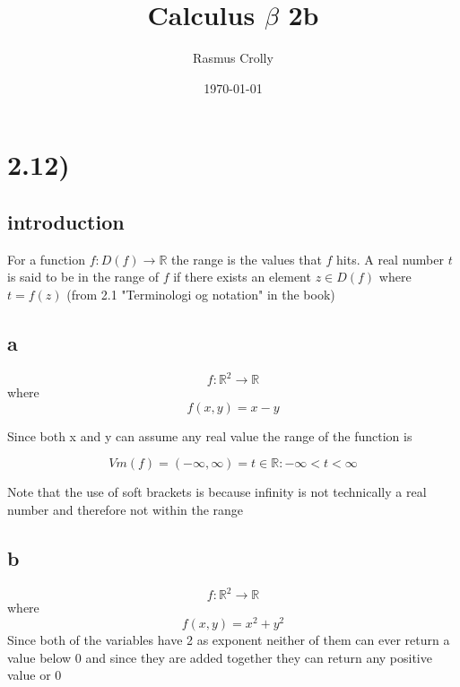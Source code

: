 \documentclass[12pt,a4paper]{article}
\title{Calculus $\beta$ 2b}
\author{Rasmus Crolly}
\date{\today}
\newcommand{\R}{\mathbb{R}}
\begin{document}
\maketitle

\section{2.12)}


\subsection{introduction}
For a function 
\begin{math}
f : D(f)\to\R
\end{math}
the range is the values that \begin{math}
f
\end{math}
hits.
A real number \begin{math}
t
\end{math}
is said to be in the range of 
\begin{math}
f
\end{math}
if there exists an element \begin{math}
z \in D(f)
\end{math}
where
\begin{math}
t=f(z)
\end{math}
(from 2.1 "Terminologi og notation" in the book) \cite{calcbeta2.1}


\subsection{a}
\begin{equation} 
f : \R ^2\to \R 
\end{equation}
where
\begin{equation} 
f(x,y)=x-y
\end{equation}

Since both x and y can assume any real value the range of the function is

\begin{equation} 
Vm(f)=\left(-\infty,\infty\right)={t\in\R : -\infty < t < \infty }
\end{equation}

Note that the use of soft brackets is because infinity is not technically a real number and therefore not within the range

\subsection{b}
\begin{equation} 
f : \R ^2 \to \R 
\end{equation}
where
\begin{equation} 
f(x,y)=x^2+y^2
\end{equation}
Since both of the variables have 2 as exponent neither of them can ever return a value below 0 and since they are added together they can return any positive value or 0
\end{document}
